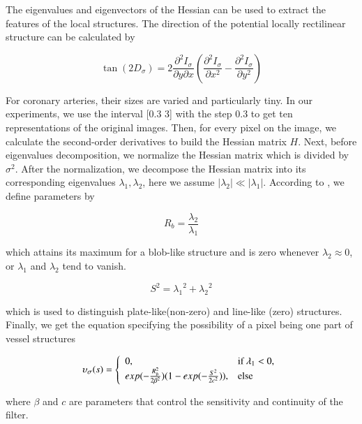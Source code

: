 The eigenvalues and eigenvectors of the Hessian can be used to extract
the features of the local structures. The direction of the potential
locally rectilinear structure can be calculated by

\begin{equation}\label{localdirection}
\tan (2D_{\sigma}) = 2 {\frac{\partial^2 I_{\sigma} }{\partial y \partial x}} ({\frac{\partial^2 I_{\sigma} }{\partial x^2}} - {\frac{\partial^2 I_{\sigma} }{\partial y^2}})
\end{equation}

For coronary arteries, their sizes are varied and particularly tiny. In our
experiments, we use the interval [0.3 3] with the step 0.3 to get ten
representations of the original images. Then, for every pixel on the image,
we calculate the second-order derivatives to build the Hessian matrix $H$.
Next, before eigenvalues decomposition, we normalize the Hessian matrix
which is divided by $\sigma^{2}$. After the normalization, we decompose the
Hessian matrix into its corresponding eigenvalues $\lambda_{1},
\lambda_{2}$, here we assume $\vert \lambda_{2} \vert \ll \vert \lambda_{1}
\vert $. According to \cite{Frangi}, we define parameters by

\begin{equation}
\label{Rb}
R_{b} = \frac{\lambda_{2}}{\lambda_{1}}
\end{equation}

which attains its maximum for a blob-like structure and is zero whenever
$\lambda_{2} \approx 0$, or $\lambda_{1}$ and $\lambda_{2}$ tend to vanish.

\begin{equation}
\label{Rb}
S^{2} = {\lambda_{1}}^2 + {\lambda_{2}}^2
\end{equation}

which is used to distinguish plate-like(non-zero) and line-like (zero)
structures. Finally, we get the equation specifying the possibility of
a pixel being one part of vessel structures

\begin{equation}
\label{v0s}
\upsilon_{\sigma}(s)=
\left\{
  \begin{array}{ll}
    0, & \hbox{if $\lambda_{1}<0$,} \\
    exp(-\frac{R_{b}^2}{2\beta^2})(1-exp(-\frac{S^2}{2c^2})), & \hbox{else}
  \end{array}
\right.
\end{equation}

where $\beta$ and $c$ are parameters that control the sensitivity and
continuity of the filter.

